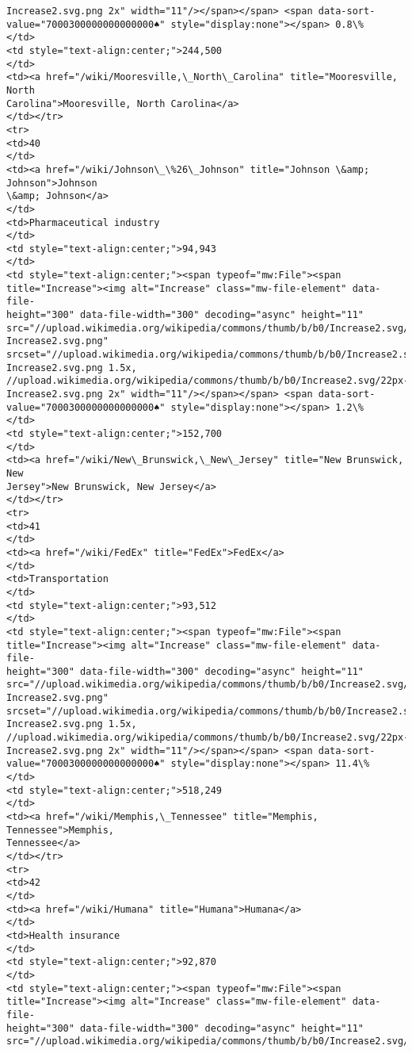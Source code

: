 \documentclass[11pt]{article}
\begin{document}
\begin{Verbatim}[commandchars=\\\{\}]
Increase2.svg.png 2x" width="11"/></span></span> <span data-sort-
value="7000300000000000000♠" style="display:none"></span> 0.8\%
</td>
<td style="text-align:center;">244,500
</td>
<td><a href="/wiki/Mooresville,\_North\_Carolina" title="Mooresville, North
Carolina">Mooresville, North Carolina</a>
</td></tr>
<tr>
<td>40
</td>
<td><a href="/wiki/Johnson\_\%26\_Johnson" title="Johnson \&amp; Johnson">Johnson
\&amp; Johnson</a>
</td>
<td>Pharmaceutical industry
</td>
<td style="text-align:center;">94,943
</td>
<td style="text-align:center;"><span typeof="mw:File"><span
title="Increase"><img alt="Increase" class="mw-file-element" data-file-
height="300" data-file-width="300" decoding="async" height="11"
src="//upload.wikimedia.org/wikipedia/commons/thumb/b/b0/Increase2.svg/11px-
Increase2.svg.png"
srcset="//upload.wikimedia.org/wikipedia/commons/thumb/b/b0/Increase2.svg/17px-
Increase2.svg.png 1.5x,
//upload.wikimedia.org/wikipedia/commons/thumb/b/b0/Increase2.svg/22px-
Increase2.svg.png 2x" width="11"/></span></span> <span data-sort-
value="7000300000000000000♠" style="display:none"></span> 1.2\%
</td>
<td style="text-align:center;">152,700
</td>
<td><a href="/wiki/New\_Brunswick,\_New\_Jersey" title="New Brunswick, New
Jersey">New Brunswick, New Jersey</a>
</td></tr>
<tr>
<td>41
</td>
<td><a href="/wiki/FedEx" title="FedEx">FedEx</a>
</td>
<td>Transportation
</td>
<td style="text-align:center;">93,512
</td>
<td style="text-align:center;"><span typeof="mw:File"><span
title="Increase"><img alt="Increase" class="mw-file-element" data-file-
height="300" data-file-width="300" decoding="async" height="11"
src="//upload.wikimedia.org/wikipedia/commons/thumb/b/b0/Increase2.svg/11px-
Increase2.svg.png"
srcset="//upload.wikimedia.org/wikipedia/commons/thumb/b/b0/Increase2.svg/17px-
Increase2.svg.png 1.5x,
//upload.wikimedia.org/wikipedia/commons/thumb/b/b0/Increase2.svg/22px-
Increase2.svg.png 2x" width="11"/></span></span> <span data-sort-
value="7000300000000000000♠" style="display:none"></span> 11.4\%
</td>
<td style="text-align:center;">518,249
</td>
<td><a href="/wiki/Memphis,\_Tennessee" title="Memphis, Tennessee">Memphis,
Tennessee</a>
</td></tr>
<tr>
<td>42
</td>
<td><a href="/wiki/Humana" title="Humana">Humana</a>
</td>
<td>Health insurance
</td>
<td style="text-align:center;">92,870
</td>
<td style="text-align:center;"><span typeof="mw:File"><span
title="Increase"><img alt="Increase" class="mw-file-element" data-file-
height="300" data-file-width="300" decoding="async" height="11"
src="//upload.wikimedia.org/wikipedia/commons/thumb/b/b0/Increase2.svg/11px-

\end{Verbatim}
\end{document}
